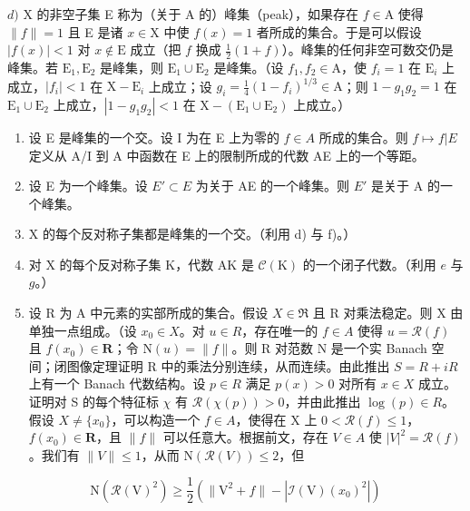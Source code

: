 \(d)\) X 的非空子集 E 称为（关于 A 的）峰集（peak），如果存在 \(f\in \mathrm{A}\) 使得 \(\| f\| = 1\) 且 E 是诸 \(x\in \mathrm{X}\) 中使 \(f(x) = 1\) 者所成的集合。于是可以假设 \(|f(x)| < 1\) 对 \(x\notin \mathrm{E}\) 成立（把 \(f\) 换成 \(\frac{1}{2} (1 + f)\)）。峰集的任何非空可数交仍是峰集。若 \(\mathrm{E}_1,\mathrm{E}_2\) 是峰集，则 \(\mathrm{E}_1\cup \mathrm{E}_2\) 是峰集。（设 \(f_{1},f_{2}\in \mathrm{A}\)，使 \(f_{i} = 1\) 在 \(\mathrm{E}_i\) 上成立，\(|f_i| < 1\) 在 \(\mathrm{X - E}_i\) 上成立；设 \(g_{i} = \frac{1}{4} (1 - f_{i})^{1 / 3}\in \mathrm{A}\)；则 \(1 - g_{1}g_{2} = 1\) 在 \(\mathrm{E}_1\cup \mathrm{E}_2\) 上成立，\(|1 - g_1g_2| < 1\) 在 \(\mathrm{X - (E_1\cup E_2)}\) 上成立。）

\begin{enumerate}
\def\labelenumi{\alph{enumi})}
\setcounter{enumi}{4}
\item
  设 E 是峰集的一个交。设 I 为在 E 上为零的 \(f \in A\) 所成的集合。则 \(f \mapsto f|E\) 定义从 A/I 到 A 中函数在 E 上的限制所成的代数 A\textbar E 上的一个等距。
\item
  设 E 为一个峰集。设 \(E' \subset E\) 为关于 A\textbar E 的一个峰集。则 \(E'\) 是关于 A 的一个峰集。
\item
  X 的每个反对称子集都是峰集的一个交。（利用 d) 与 f)。）
\item
  对 X 的每个反对称子集 K，代数 A\textbar K 是 \(\mathcal{C}(\mathrm{K})\) 的一个闭子代数。（利用 \(e\) 与 \(g\)。）
\item
  设 R 为 A 中元素的实部所成的集合。假设 \(X \in \mathfrak{R}\) 且 R 对乘法稳定。则 X 由单独一点组成。（设 \(x_{0} \in X\)。对 \(u \in R\)，存在唯一的 \(f \in A\) 使得 \(u = \mathcal{R}(f)\) 且 \(f(x_{0}) \in \mathbf{R}\)；令 \(\mathrm{N}(u) = \|f\|\)。则 R 对范数 N 是一个实 Banach 空间；闭图像定理证明 R 中的乘法分别连续，从而连续。由此推出 \(S = R + iR\) 上有一个 Banach 代数结构。设 \(p \in R\) 满足 \(p(x) > 0\) 对所有 \(x \in X\) 成立。证明对 S 的每个特征标 \(\chi\) 有 \(\mathcal{R}(\chi(p)) > 0\)，并由此推出 \(\log(p) \in R\)。假设 \(X \neq \{x_{0}\}\)，可以构造一个 \(f \in A\)，使得在 X 上 \(0 < \mathcal{R}(f) \leqslant 1\)，\(f(x_{0}) \in \mathbf{R}\)，且 \(\|f\|\) 可以任意大。根据前文，存在 \(V \in A\) 使 \(|V|^{2} = \mathcal{R}(f)\)。我们有 \(\|V\| \leqslant 1\)，从而 \(\mathrm{N}(\mathcal{R}(V)) \leqslant 2\)，但
\end{enumerate}

\[
\mathrm{N} (\mathcal {R} (\mathrm{V}) ^ {2}) \geqslant \frac {1}{2} \left(\| \mathrm{V} ^ {2} + f \| - | \mathcal {I} (\mathrm{V}) (x _ {0}) ^ {2} |\right)
\]


